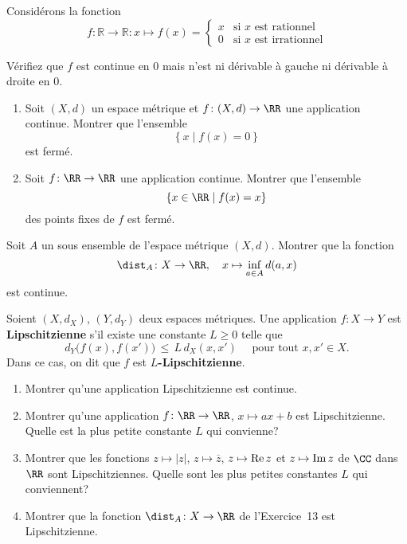  \exerNico Considérons la fonction
$$f:\mathbb{R}\rightarrow\mathbb{R}:x\mapsto f(x)=\left\{
\begin{array}{ll}
x&\text{si }x\text{ est rationnel}\\
0&\text{si }x\text{ est irrationnel}
\end{array}
\right.$$

Vérifiez que $f$ est continue en $0$ mais n'est ni dérivable à  gauche ni dérivable à droite en
$0$.

\exerNico 
\begin{enumerate}
\item Soit $(X,d)$ un espace métrique et $f \colon (X,d) \to \RR$ une application continue.
Montrer que l'ensemble $$\left\{ x \mid f(x) = 0 \right\}$$ est fermé.

\item Soit $f \colon \RR \to \RR$ une application continue.
Montrer que l'ensemble 
$$
\{ x \in \RR \mid f(x) = x\}
$$
des points fixes de $f$ est fermé.

\end{enumerate}

\exerNico  Soit $A$ un sous ensemble de l'espace métrique $(X,d)$.
Montrer que la fonction
$$
\dist_A \colon X \to \RR,
\quad x \mapsto \inf_{a \in A} d(a,x)
$$ 
est continue.


\exerNico  Soient $(X,d_X)$, $(Y,d_Y)$ deux espaces métriques.
Une application $f \colon X \to Y$ est {\bf Lipschitzienne}
s'il existe une constante $L \ge 0$ telle que
$$
d_Y \bigl( f(x), f(x') \bigr) \,\le\, L \,d_X (x,x') 
\quad \text{ pour tout } x,x' \in X.
$$
Dans ce cas, on dit que $f$ est {\bf $L$-Lipschitzienne}.


\begin{enumerate}
\item
Montrer qu'une application Lipschitzienne est continue.
\item Montrer qu'une application $f \colon \RR \to \RR$, $x \mapsto ax+b$
est Lipschitzienne.
Quelle est la plus petite constante $L$ qui convienne?

\item Montrer que les fonctions $z \mapsto |z|$, 
$z \mapsto \overline z$,
$z \mapsto {\rm Re\,} z$ et $z \mapsto {\rm Im\,} z$ 
de $\CC$ dans $\RR$ sont Lipschitziennes.
Quelle sont les plus petites constantes $L$ qui conviennent?
\item Montrer que la fonction $\dist_A \colon X \to \RR$ de l'Exercice~13 est Lipschitzienne.

\end{enumerate}

